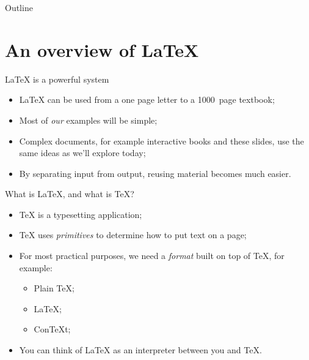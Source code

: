 \begin{frame}{Outline}
  \tableofcontents
\end{frame}

\section{An overview of \LaTeX}

\begin{frame}{\LaTeX{} is a powerful system}

  \begin{itemize}
    \item \LaTeX{} can be used from a one page letter to a 1000~page
      textbook;
    \item Most of \emph{our} examples will be simple;
    \item Complex documents, for example interactive books and
      these slides, use the same ideas as we'll explore today;
    \item By separating input from output, reusing material becomes 
      much easier.
  \end{itemize}
  
\end{frame}

\begin{frame}{What is \LaTeX, and what is \TeX?}

  \begin{itemize}
    \item \TeX{} is a typesetting application;
    \item \TeX{} uses \emph{primitives} to determine how to put text
      on a page;
    \item For most practical purposes, we need a \emph{format} built 
      on top of \TeX, for example:
      \begin{itemize}
        \item Plain \TeX;
        \item \LaTeX;
        \item Con\TeX{}t;
      \end{itemize}
    \item You can think of \LaTeX{} as an interpreter between you and
      \TeX.
  \end{itemize}

\end{frame}

